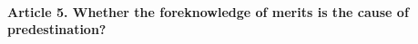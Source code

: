 \documentclass{ucetd}
\begin{document}
\paragraph{Article 5. Whether the foreknowledge of merits is the cause of predestination?}
\end{document}
